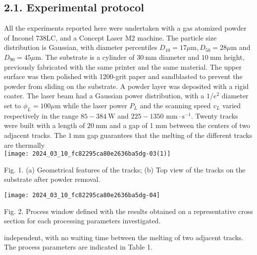 \documentclass[10pt]{article}
\begin{document}
\subsection*{2.1. Experimental protocol}
All the experiments reported here were undertaken with a gas atomized powder of Inconel $738 \mathrm{LC}$, and a Concept Laser M2 machine. The particle size distribution is Gaussian, with diameter percentiles $D_{10}=17 \mu \mathrm{m}, D_{50}=28 \mu \mathrm{m}$ and $D_{90}=45 \mu \mathrm{m}$. The substrate is a cylinder of $30 \mathrm{~mm}$ diameter and $10 \mathrm{~mm}$ height, previously fabricated with the same printer and the same material. The upper surface was then polished with 1200-grit paper and sandblasted to prevent the powder from sliding on the substrate. A powder layer was deposited with a rigid coater. The laser beam had a Gaussian power distribution, with a $1 / e^{2}$ diameter set to $\phi_{L}=100 \mu \mathrm{m}$ while the laser power $P_{L}$ and the scanning speed $v_{L}$ varied respectively in the range $85-384 \mathrm{~W}$ and $225-1350$ $\mathrm{mm} \cdot \mathrm{s}^{-1}$. Twenty tracks were built with a length of $20 \mathrm{~mm}$ and a gap of 1 $\mathrm{mm}$ between the centers of two adjacent tracks. The $1 \mathrm{~mm}$ gap guarantees that the melting of the different tracks are thermally\\
\texttt{[image: 2024\_03\_10\_fc82295ca80e2636ba5dg-03(1)]}

Fig. 1. (a) Geometrical features of the tracks; (b) Top view of the tracks on the substrate after powder removal.

\begin{center}
\texttt{[image: 2024\_03\_10\_fc82295ca80e2636ba5dg-04]}
\end{center}

Fig. 2. Process window defined with the results obtained on a representative cross section for each processing parameters investigated.

independent, with no waiting time between the melting of two adjacent tracks. The process parameters are indicated in Table 1.
\end{document}
